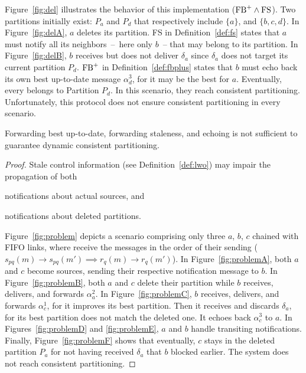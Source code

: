 Figure~\ref{fig:del} illustrates the behavior of this implementation
($\textup{FB}^+ \wedge \textup{FS}$).  Two partitions initially exist:
$P_a$ and $P_d$ that respectively include $\{a\}$, and $\{b, c,
d\}$. In Figure~\ref{fig:delA}, $a$ deletes its partition. FS in
Definition~\ref{def:fs} states that $a$ must notify all its
neighbors~--~here only $b$~-- that may belong to its partition.  In
Figure~\ref{fig:delB}, $b$ receives but does not deliver $\delta_a$
since $\delta_a$ does not target its current partition $P_d$.
$\textup{FB}^+$ in Definition~\ref{def:fbplus} states that $b$ must
echo back its own best up-to-date message $\alpha_d^3$, for it may be
the best for $a$. Eventually, every \process belongs to Partition
$P_d$. In this scenario, they reach consistent
partitioning. Unfortunately, this protocol does not ensure consistent
partitioning in every scenario.


\begin{lemma} Forwarding best up-to-date,
  forwarding staleness, and echoing is not sufficient to guarantee
  dynamic consistent partitioning.
\end{lemma}

\begin{proof}
Stale control information (see Definition~\ref{def:lwo}) may impair
the propagation of both
\begin{inparaenum}[(i)]
\item notifications about actual sources, and
\item notifications about deleted partitions.
\end{inparaenum}
Figure~\ref{fig:problem} depicts a scenario comprising only three
\processes $a$, $b$, $c$ chained with FIFO links, \ie where \processes
receive the messages in the order of their sending ($s_{pq}(m)
\rightarrow s_{pq}(m') \implies r_q(m) \rightarrow r_q(m')$). In
Figure~\ref{fig:problemA}, both $a$ and $c$ become sources, sending
their respective notification message to $b$. In
Figure~\ref{fig:problemB}, both $a$ and $c$ delete their partition
while $b$ receives, delivers, and forwards $\alpha_a^2$. In
Figure~\ref{fig:problemC}, $b$ receives, delivers, and forwards
$\alpha_c^1$, for it improves its best partition. Then it receives and
discards $\delta_a$, for its best partition does not match the deleted
one. It echoes back $\alpha_c^3$ to $a$. In Figures~\ref{fig:problemD}
and \ref{fig:problemE}, $a$ and $b$ handle transiting
notifications. Finally, Figure~\ref{fig:problemF} shows that
eventually, $c$ stays in the deleted partition $P_a$ for not having
received $\delta_a$ that $b$ blocked earlier. The system does not
reach consistent partitioning. \end{proof}

